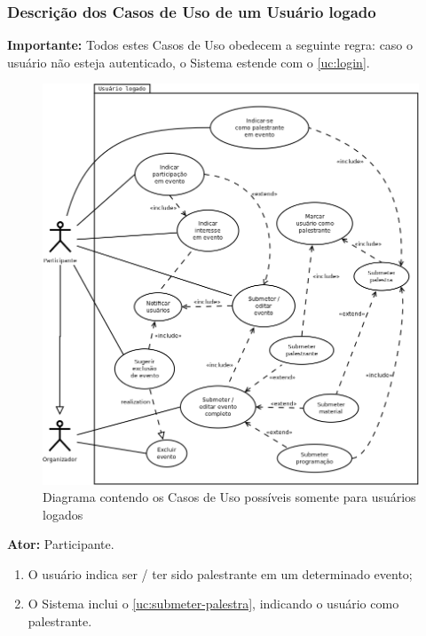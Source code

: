 \documentclass[12pt,a4paper,twoside,hyphens,english,brazil]{abntex2}
\begin{document}
{%
\subsubsection{Descrição dos Casos de Uso de um Usuário logado} \label{sec:uc-logado}
\textbf{Importante:} Todos estes Casos de Uso obedecem a seguinte regra: caso o usuário não esteja autenticado, o Sistema estende com o \ref{uc:login}.

\begin{figure}[!ht]
\centering
	\includegraphics[width=1\linewidth]{diagramas/uc-logado.png}
	\caption{Diagrama contendo os Casos de Uso possíveis somente para usuários logados}
	\label{diag:uc-logado}
\end{figure}

\textbf{Ator:} Participante.
\begin{enumerate}[itemsep=-1ex,topsep=-1ex]
	\item O usuário indica ser / ter sido palestrante em um determinado evento;
	\item O Sistema inclui o \ref{uc:submeter-palestra}, indicando o usuário como palestrante.
\end{enumerate}

}
\end{document}
